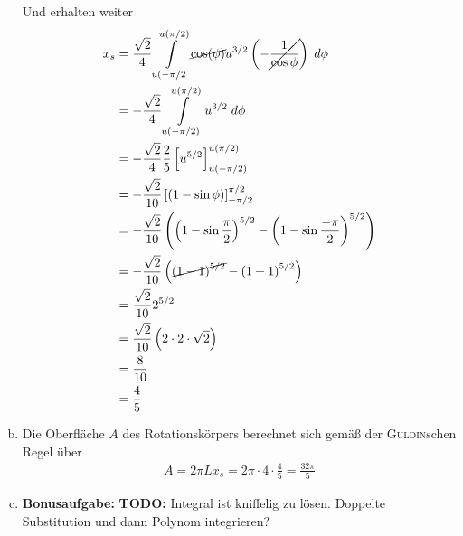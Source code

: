 \documentclass[a4paper,german,12pt,smallheadings]{scrartcl}
\begin{document}
\begin{enumerate}[a)]
    Und erhalten weiter
    \begin{align*}
      x_s &= \frac{\sqrt{2}}{4} \int\limits_{u(-\pi/2}^{u(\pi/2)} \cancel{\cos(\phi)} u^{3/2} \left(-\cancel{\frac{1}{\cos \phi}}\right) \; d\phi \\
          &= -\frac{\sqrt{2}}{4} \int\limits_{u(-\pi/2)}^{u(\pi/2)} u^{3/2} \; d\phi \\
          &= -\frac{\sqrt{2}}{4} \frac{2}{5} \left[u^{5/2}\right]_{u(-\pi/2)}^{u(\pi/2)} \\
          &= -\frac{\sqrt{2}}{10}\left[(1-\sin \phi)\right]_{-\pi/2}^{\pi/2} \\
          &= -\frac{\sqrt{2}}{10} \left(\left(1-\sin \frac{\pi}{2}\right)^{5/2} - \left(1-\sin \frac{-\pi}{2}\right)^{5/2}\right) \\
          &= -\frac{\sqrt{2}}{10} \left(\cancel{\left(1-1\right)^{5/2}} - \left(1+1\right)^{5/2}\right) \\
          &= \frac{\sqrt{2}}{10} 2^{5/2} \\
          &= \frac{\sqrt{2}}{10} \left(2\cdot2\cdot\sqrt{2}\right) \\
          &= \frac{8}{10} \\
          &= \frac{4}{5} \\
    \end{align*}
  \item
    Die Oberfläche $A$ des Rotationskörpers berechnet sich gemäß der
    \textsc{Guldin}schen Regel über
    \begin{align*}
      A = 2 \pi L x_s = 2 \pi \cdot 4 \cdot \frac{4}{5} = \frac{32 \pi}{5}
    \end{align*}
  \item
    \textbf{Bonusaufgabe:} 
    \textbf{TODO:} Integral ist kniffelig zu lösen. Doppelte Substitution und dann Polynom integrieren?

\end{enumerate}
\end{document}
